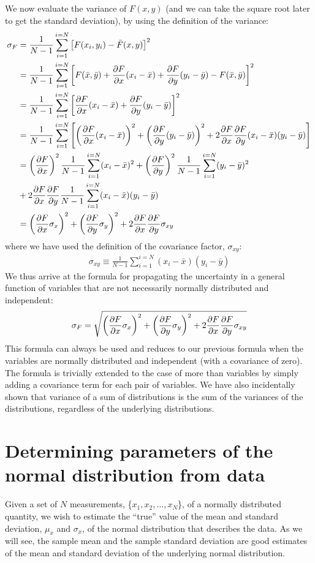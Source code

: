 We now evaluate the variance of $F(x,y)$ (and we can take the square root later to get the standard deviation), by using the definition of the variance:
\begin{align}
\sigma_F&=\frac{1}{N-1}\sum_{i=1}^{i=N}\left[F(x_i,y_i)-\bar F(x,y)\right]^2\nonumber\\
&=\frac{1}{N-1}\sum_{i=1}^{i=N}\left[F(\bar x,\bar y)+\frac{\partial F}{\partial x}(x_i-\bar x)+\frac{\partial F}{\partial y}(y_i-\bar y)-F(\bar x,\bar y)\right]^2\nonumber\\
&=\frac{1}{N-1}\sum_{i=1}^{i=N}\left[\frac{\partial F}{\partial x}(x_i-\bar x)+\frac{\partial F}{\partial y}(y_i-\bar y)\right]^2\nonumber\\
&=\frac{1}{N-1}\sum_{i=1}^{i=N}\left[\left(\frac{\partial F}{\partial x}(x_i-\bar x)\right)^2+\left(\frac{\partial F}{\partial y}(y_i-\bar y)\right)^2+2 \frac{\partial F}{\partial x}\frac{\partial F}{\partial y}(x_i-\bar x) (y_i-\bar y) \right]\nonumber\\
&=\left(\frac{\partial F}{\partial x}\right)^2\frac{1}{N-1}\sum_{i=1}^{i=N}(x_i-\bar x)^2+\left(\frac{\partial F}{\partial y}\right)^2\frac{1}{N-1}\sum_{i=1}^{i=N}(y_i-\bar y)^2\nonumber\\
&+2\frac{\partial F}{\partial x}\frac{\partial F}{\partial y}\frac{1}{N-1}\sum_{i=1}^{i=N}(x_i-\bar x) (y_i-\bar y)\nonumber\\
&=\left(\frac{\partial F}{\partial x}\sigma_x\right)^2+\left(\frac{\partial F}{\partial y}\sigma_y\right)^2+2\frac{\partial F}{\partial x}\frac{\partial F}{\partial y}\sigma_{xy}
\end{align}
where we have used the definition of the covariance factor, $\sigma_{xy}$:
\begin{align}
\sigma_{xy}\equiv\frac{1}{N-1}\sum_{i=1}^{i=N}(x_i-\bar x) (y_i-\bar y)
\end{align}
We thus arrive at the formula for propagating the uncertainty in a general function of variables that are not necessarily normally distributed and independent:
\begin{align}
\label{eqn:coverror}
\sigma_F=\sqrt{\left(\frac{\partial F}{\partial x}\sigma_x\right)^2+\left(\frac{\partial F}{\partial y}\sigma_y\right)^2+2\frac{\partial F}{\partial x}\frac{\partial F}{\partial y}\sigma_{xy}}
\end{align} 
This formula can always be used and reduces to our previous formula when the variables are normally distributed and independent (with a covariance of zero). The formula is trivially extended to the case of more than variables by simply adding a covariance term for each pair of variables. We have also incidentally shown that variance of a sum of distributions is the sum of the variances of the distributions, regardless of the underlying distributions.

\section{Determining parameters of the normal distribution from data}
Given a set of $N$ measurements, \{$x_1, x_2, \dots, x_N$\}, of a normally distributed quantity, we wish to estimate the ``true'' value of the mean and standard deviation, $\mu_x$ and $\sigma_x$, of the normal distribution that describes the data. As we will see, the sample mean and the sample standard deviation are good estimates of the mean and standard deviation of the underlying normal distribution.

